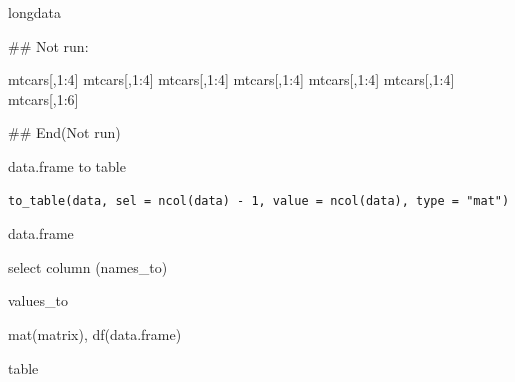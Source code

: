 \documentclass[a4paper]{book}
\begin{document}
%
\begin{Value}
longdata
\end{Value}
%
\begin{Examples}
\begin{ExampleCode}
## Not run: 

mtcars[,1:4] %
mtcars[,1:4] %
mtcars[,1:4] %
mtcars[,1:4] %
mtcars[,1:4] %
mtcars[,1:4] %
mtcars[,1:6] %







## End(Not run)
\end{ExampleCode}
\end{Examples}
%
\begin{Description}
data.frame to table
\end{Description}
%
\begin{Usage}
\begin{verbatim}
to_table(data, sel = ncol(data) - 1, value = ncol(data), type = "mat")
\end{verbatim}
\end{Usage}
%
\begin{Arguments}
\begin{ldescription}
\item[\code{data}] data.frame

\item[\code{sel}] select column (names\_to)

\item[\code{value}] values\_to

\item[\code{type}] mat(matrix), df(data.frame)
\end{ldescription}
\end{Arguments}
%
\begin{Value}
table
\end{Value}
%
\end{document}
